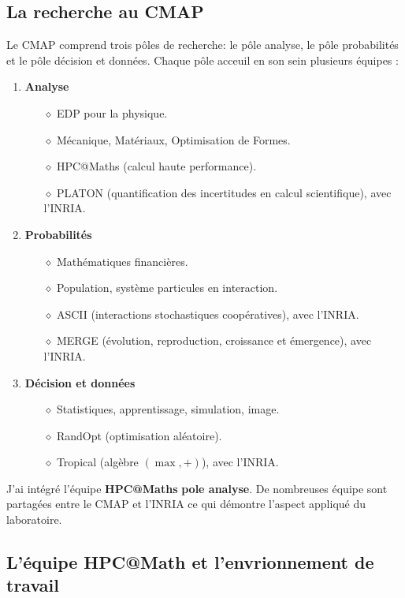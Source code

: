\subsection{La recherche au CMAP}
Le CMAP comprend trois pôles  de recherche: le pôle analyse, le pôle probabilités et le pôle décision et données. Chaque pôle acceuil en son sein plusieurs équipes :
\begin{enumerate}
    \item \textbf{Analyse}
        \begin{itemize}
            \item[$\diamond$] EDP pour la physique.
            \item[$\diamond$] Mécanique, Matériaux, Optimisation de Formes.
            \item[$\diamond$] HPC@Maths (calcul haute performance).
            \item[$\diamond$] PLATON (quantification des incertitudes en calcul scientifique), avec l'INRIA.
        \end{itemize}
    \item \textbf{Probabilités}
        \begin{itemize}
            \item[$\diamond$] Mathématiques financières.
            \item[$\diamond$] Population, système particules en interaction.
            \item[$\diamond$] ASCII (interactions stochastiques coopératives), avec l'INRIA.
            \item[$\diamond$] MERGE (évolution, reproduction, croissance et émergence), avec l'INRIA.
        \end{itemize}
    \item \textbf{Décision et données}
        \begin{itemize}
            \item[$\diamond$] Statistiques, apprentissage, simulation, image.
            \item[$\diamond$] RandOpt (optimisation aléatoire).
            \item[$\diamond$] Tropical (algèbre $(\max , +)$), avec l’INRIA.
        \end{itemize}
\end{enumerate}
J'ai intégré l'équipe \textbf{HPC@Maths} \textbf{pole analyse}.
De nombreuses équipe sont partagées entre le CMAP et l'INRIA ce qui démontre l'aspect appliqué du laboratoire.

\subsection{L'équipe HPC@Math et l'envrionnement de travail}
